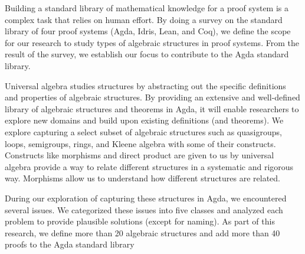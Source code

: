 Building a standard library of mathematical knowledge for a proof system is a
complex task that relies on human effort. By doing a survey on the standard library
of four proof systems (Agda, Idris, Lean, and Coq), we define the scope for our
research to study types of algebraic structures in proof systems. From the
result of the survey, we establish our focus to contribute to the Agda standard
library. 

Universal algebra studies structures by abstracting out the specific definitions
and properties of algebraic structures. By providing an extensive and
well-defined library of algebraic structures and theorems in Agda, it will
enable researchers to explore new domains and build upon existing definitions
(and theorems). We explore capturing a select subset of algebraic structures
such as quasigroups, loops, semigroups, rings, and Kleene algebra with some of
their constructs. Constructs like morphisms and direct product are given to us
by universal algebra provide a way to relate different structures in a
systematic and rigorous way. Morphisms allow us to understand how different
structures are related.

During our exploration of capturing these structures in Agda, we encountered
several issues. We categorized these issues into five classes and analyzed each
problem to provide plausible solutions (except for naming). As part
of this research, we define more than 20 algebraic structures and add more than
40 proofs to the Agda standard library